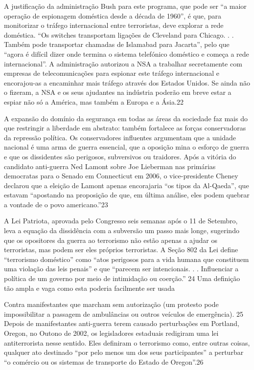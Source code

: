  \par 
A justificação da administração Bush para este programa, que pode ser “a maior operação de espionagem doméstica desde a década de 1960”, é que, para monitorizar o tráfego internacional entre terroristas, deve explorar a rede doméstica. “Os switches transportam ligações de Cleveland para Chicago. . . Também pode transportar chamadas de Islamabad para Jacarta”, pelo que “agora é difícil dizer onde termina o sistema telefónico doméstico e começa a rede internacional”. A administração autorizou a NSA a trabalhar secretamente com empresas de telecomunicações para espionar este tráfego internacional e encorajou-as a encaminhar mais tráfego através dos Estados Unidos. Se ainda não o fizeram, a NSA e os seus ajudantes na indústria poderão em breve estar a espiar não só a América, mas também a Europa e a Ásia.{\color{blue}22}
 \par 
A expansão do domínio da segurança em todas as áreas da sociedade faz mais do que restringir a liberdade em abstrato: também fortalece as forças conservadoras da repressão política. Os conservadores influentes argumentam que a unidade nacional é uma arma de guerra essencial, que a oposição mina o esforço de guerra e que os dissidentes são perigosos, subversivos ou traidores. Após a vitória do candidato anti-guerra Ned Lamont sobre Joe Lieberman nas primárias democratas para o Senado em Connecticut em 2006, o vice-presidente Cheney declarou que a eleição de Lamont apenas encorajaria “os tipos da Al-Qaeda”, que estavam “apostando na proposição de que, em última análise, eles podem quebrar a vontade de o povo americano.”{\color{blue}23}
 \par 
A Lei Patriota, aprovada pelo Congresso seis semanas após o {\color{blue}11} de Setembro, leva a equação da dissidência com a subversão um passo mais longe, sugerindo que os opositores da guerra ao terrorismo não estão apenas a ajudar os terroristas, mas podem ser eles próprios terroristas. A Seção {\color{blue}802} da Lei define “terrorismo doméstico” como “atos perigosos para a vida humana que constituem uma violação das leis penais” e que “parecem ser intencionais. . . Influenciar a política de um governo por meio de intimidação ou coerção.” {\color{blue}24} Uma definição tão ampla e vaga como esta poderia facilmente ser usada
 \par 
Contra manifestantes que marcham sem autorização (um protesto pode impossibilitar a passagem de ambulâncias ou outros veículos de emergência). {\color{blue}25} Depois de manifestantes anti-guerra terem causado perturbações em Portland, Oregon, no Outono de 2002, os legisladores estaduais redigiram uma lei antiterrorista nesse sentido. Eles definiram o terrorismo como, entre outras coisas, qualquer ato destinado “por pelo menos um dos seus participantes” a perturbar “o comércio ou os sistemas de transporte do Estado de Oregon”.{\color{blue}26}
